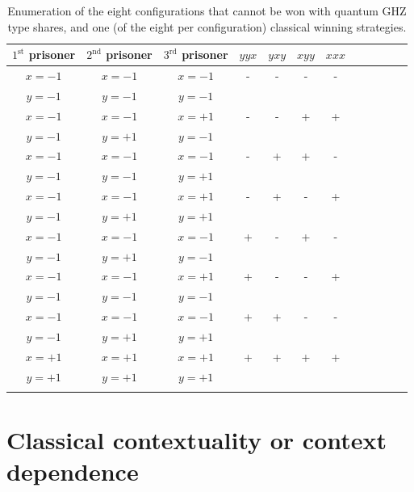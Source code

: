\documentclass[sn-mathphys]{sn-jnl}%
\theoremstyle{thmstyleone}%
\theoremstyle{thmstyletwo}%
\theoremstyle{thmstylethree}%
\begin{document}
\begin{table}[t]%
 \begin{center}
 \caption{Enumeration of the eight configurations that cannot be won with quantum GHZ type shares, and one (of the eight per configuration) classical winning strategies.
\label{2020-hardy-t-eveevac}}
 \begin{tabular}{ c c c c c c c c c c c c }
\toprule
$1^\text{st}$ prisoner&$2^\text{nd}$ prisoner&$3^\text{rd}$ prisoner&    $yyx$ & $yxy$ &  $xyy$  & $xxx$
\\
\midrule
$x=-1$ & $x=-1$ & $x=-1$&  {\Large -} & {\Large -} &  {\Large -} & {\Large -}\\
$y=-1$ & $y=-1$ & $y= -1$\\
$x=-1$ & $x=-1$ & $x=+1$&   {\Large -} & {\Large -} &  {\Large +} & {\Large +}\\
$y=-1$ & $y=+1$ & $y= -1$\\
$x=-1$ & $x=-1$ & $x=-1$&   {\Large -} & {\Large +} &  {\Large +} & {\Large -}\\
$y=-1$ & $y=-1$ & $y= +1$\\
$x=-1$ & $x=-1$ & $x=+1$&   {\Large -} & {\Large +} &  {\Large -} & {\Large +}\\
$y=-1$ & $y=+1$ & $y= +1$\\
$x=-1$ & $x=-1$ & $x=-1$&   {\Large +} & {\Large -} &  {\Large +} & {\Large -}\\
$y=-1$ & $y=+1$ & $y= -1$\\
$x=-1$ & $x=-1$ & $x=+1$&   {\Large +} & {\Large -} &  {\Large -} & {\Large +}\\
$y=-1$ & $y=-1$ & $y= -1$\\
$x=-1$ & $x=-1$ & $x=-1$&   {\Large +} & {\Large +} &  {\Large -} & {\Large -}\\
$y=-1$ & $y=+1$ & $y= +1$\\
$x=+1$&$x=+1$&$x=+1$& {\Large +} & {\Large +} &  {\Large +} & {\Large +}\\
$y=+ 1$ & $y=+1$ & $y= + 1$   \\
\botrule
\end{tabular}
 \end{center}
 \end{table}



\section{Classical contextuality or context dependence}
\end{document}
